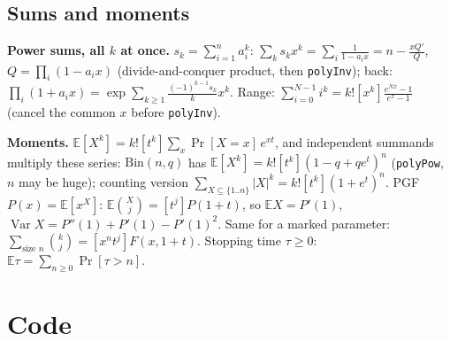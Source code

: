 	\subsection{Sums and moments}
	\textbf{Power sums, all $k$ at once.} $s_k=\sum_{i=1}^na_i^k$: $\sum_ks_kx^k=\sum_i\frac1{1-a_ix}=n-\frac{xQ'}{Q}$, $Q=\prod_i(1-a_ix)$ (divide-and-conquer product, then \texttt{polyInv}); back: $\prod_i(1+a_ix)=\exp\sum_{k\ge1}\frac{(-1)^{k-1}s_k}kx^k$. Range: $\sum_{i=0}^{N-1}i^k=k![x^k]\frac{e^{Nx}-1}{e^x-1}$ (cancel the common $x$ before \texttt{polyInv}).

	\textbf{Moments.} $\mathbb E[X^k]=k![t^k]\sum_x\Pr[X=x]\,e^{xt}$, and independent summands multiply these series: $\mathrm{Bin}(n,q)$ has $\mathbb E[X^k]=k![t^k](1-q+qe^t)^n$ (\texttt{polyPow}, $n$ may be huge); counting version $\sum_{X\subseteq\{1..n\}}|X|^k=k![t^k](1+e^t)^n$. PGF $P(x)=\mathbb E[x^X]$: $\mathbb E\binom Xj=[t^j]P(1+t)$, so $\mathbb E X=P'(1)$, $\operatorname{Var}X=P''(1)+P'(1)-P'(1)^2$. Same for a marked parameter: $\sum_{\text{size }n}\binom kj=[x^nt^j]F(x,1+t)$. Stopping time $\tau\ge0$: $\mathbb E\tau=\sum_{n\ge0}\Pr[\tau>n]$.

\section{Code}
